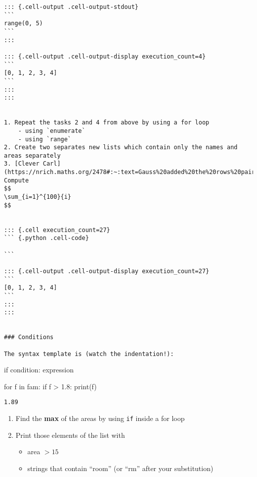 \documentclass[
  letterpaper,
  DIV=11,
  numbers=noendperiod]{scrreprt}
\newenvironment{Shaded}{\begin{snugshade}}{\end{snugshade}}
\newcommand{\BuiltInTok}[1]{\textcolor[rgb]{0.00,0.23,0.31}{#1}}
\newcommand{\ControlFlowTok}[1]{\textcolor[rgb]{0.00,0.23,0.31}{#1}}
\newcommand{\FloatTok}[1]{\textcolor[rgb]{0.68,0.00,0.00}{#1}}
\newcommand{\KeywordTok}[1]{\textcolor[rgb]{0.00,0.23,0.31}{#1}}
\newcommand{\NormalTok}[1]{\textcolor[rgb]{0.00,0.23,0.31}{#1}}
\newcommand{\OperatorTok}[1]{\textcolor[rgb]{0.37,0.37,0.37}{#1}}
\providecommand{\tightlist}{%
  \setlength{\itemsep}{0pt}\setlength{\parskip}{0pt}}\usepackage{longtable,booktabs,array}
\begin{document}
\begin{verbatim}
::: {.cell-output .cell-output-stdout}
```
range(0, 5)
```
:::

::: {.cell-output .cell-output-display execution_count=4}
```
[0, 1, 2, 3, 4]
```
:::
:::


1. Repeat the tasks 2 and 4 from above by using a for loop
    - using `enumerate`
    - using `range`
2. Create two separates new lists which contain only the names and areas separately
3. [Clever Carl](https://nrich.maths.org/2478#:~:text=Gauss%20added%20the%20rows%20pairwise,quantity%20in%20a%20clever%20way.): Compute 
$$
\sum_{i=1}^{100}{i}
$$ 


::: {.cell execution_count=27}
``` {.python .cell-code}

```

::: {.cell-output .cell-output-display execution_count=27}
```
[0, 1, 2, 3, 4]
```
:::
:::


### Conditions

The syntax template is (watch the indentation!):
\end{verbatim}

if condition: expression

\begin{Shaded}
\begin{Highlighting}[]
\ControlFlowTok{for}\NormalTok{ f }\KeywordTok{in}\NormalTok{ fam:}
    \ControlFlowTok{if}\NormalTok{ f }\OperatorTok{\textgreater{}} \FloatTok{1.8}\NormalTok{:}
        \BuiltInTok{print}\NormalTok{(f)}
\end{Highlighting}
\end{Shaded}

\begin{verbatim}
1.89
\end{verbatim}

\begin{enumerate}
\def\labelenumi{\arabic{enumi}.}
\tightlist
\item
  Find the \textbf{max} of the areas by using \texttt{if} inside a for
  loop
\item
  Print those elements of the list with

  \begin{itemize}
  \tightlist
  \item
    area \(> 15\)
  \item
    strings that contain ``room'' (or ``rm'' after your substitution)
  \end{itemize}
\end{enumerate}

\end{document}
